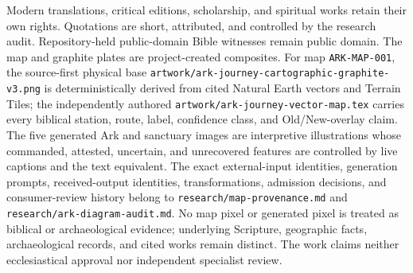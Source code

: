 Modern translations, critical editions, scholarship, and spiritual works retain
their own rights.  Quotations are short, attributed, and controlled by the
research audit.  Repository-held public-domain Bible witnesses remain public
domain.  The map and graphite plates are project-created composites.  For map
\texttt{ARK-MAP-001}, the source-first physical base
\texttt{artwork/ark-journey-cartographic-graphite-v3.png} is deterministically
derived from cited Natural Earth vectors and Terrain Tiles; the independently
authored \texttt{artwork/ark-journey-vector-map.tex} carries every biblical
station, route, label, confidence class, and Old/New-overlay claim.  The five
generated Ark and sanctuary images are interpretive illustrations whose
commanded, attested, uncertain, and unrecovered features are controlled by
live captions and the text equivalent.  The exact external-input identities,
generation prompts, received-output identities, transformations, admission
decisions, and consumer-review history belong to
\texttt{research/map-provenance.md} and
\texttt{research/ark-diagram-audit.md}.  No map pixel or generated pixel is
treated as biblical or archaeological evidence; underlying Scripture,
geographic facts, archaeological records, and cited works remain distinct.
The work claims neither ecclesiastical approval nor independent specialist
review.

\endgroup
